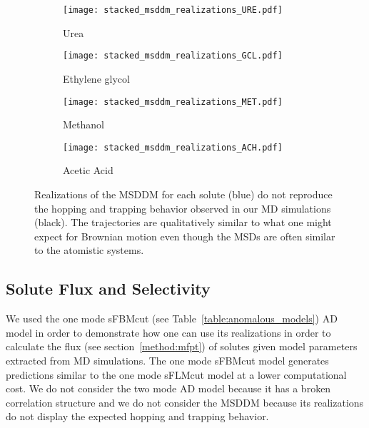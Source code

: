 \documentclass[journal=ancac3,manuscript=article,layout=twocolumn]{achemso}
\begin{document}
  \begin{figure*}
  \centering
  \begin{subfigure}{0.24\textwidth}
  \texttt{[image: stacked\_msddm\_realizations\_URE.pdf]}
  \caption{Urea}\label{fig:stacked_msddm_realizations_URE}
  \end{subfigure}
  \begin{subfigure}{0.24\textwidth}
  \texttt{[image: stacked\_msddm\_realizations\_GCL.pdf]}
  \caption{Ethylene glycol}\label{fig:stacked_msddm_realizations_GCL}
  \end{subfigure}
  \begin{subfigure}{0.24\textwidth}
  \texttt{[image: stacked\_msddm\_realizations\_MET.pdf]}
  \caption{Methanol}\label{fig:stacked_msddm_realizations_MET}
  \end{subfigure}
  \begin{subfigure}{0.24\textwidth}
  \texttt{[image: stacked\_msddm\_realizations\_ACH.pdf]}
  \caption{Acetic Acid}\label{fig:stacked_msddm_realizations_ACH}
  \end{subfigure}
  \caption{Realizations of the MSDDM for each solute (blue) do not reproduce
	  the hopping and trapping behavior observed in our MD simulations
	  (black). The trajectories are qualitatively similar to what one
	  might expect for Brownian motion even though the MSDs are often similar
	  to the atomistic systems.
  	  }\label{fig:msddm_eyetest}
  \end{figure*}
  
  \subsection{Solute Flux and Selectivity}\label{section:mfpt}
  
  We used the one mode sFBMcut (see Table~\ref{table:anomalous_models}) AD
  model in order to demonstrate how one can use its realizations in order to
  calculate the flux (see section~\ref{method:mfpt}) of solutes given model
  parameters extracted from MD simulations. The one mode sFBMcut model
  generates predictions similar to the one mode sFLMcut model at a lower
  computational cost. We do not consider the two mode AD model because it has a
  broken correlation structure and we do not consider the MSDDM because its
  realizations do not display the expected hopping and trapping behavior. 
\end{document}

